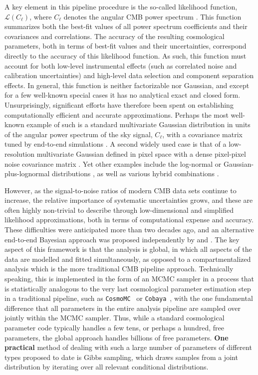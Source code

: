 \documentclass[twocolumn]{aa}
\def\cosmomc{\texttt{CosmoMC}}
\def\cobaya{\texttt{Cobaya}}
\begin{document}
A key element in this pipeline procedure is the so-called likelihood function, $\mathcal{L}(C_{\ell})$, where $C_{\ell}$ denotes the angular CMB power spectrum \citep[e.g.,][]{planck2016-l05}. This function summarizes both the best-fit values of all power spectrum coefficients and their covariances and correlations. The accuracy of the resulting cosmological parameters, both in terms of best-fit values and their uncertainties, correspond directly to the accuracy of this likelihood function. As such, this function must account for both low-level instrumental effects (such as correlated noise and calibration uncertainties) and high-level data selection and component separation effects. In general, this function is neither factorizable nor Gaussian, and except for a few well-known special cases it has no analytical exact and closed form. Unsurprisingly, significant efforts have therefore been spent on establishing computationally efficient and accurate approximations. Perhaps the most well-known example of such is a standard multivariate Gaussian distribution in units of the angular power spectrum of the sky signal, $C_{\ell}$, with a covariance matrix tuned by end-to-end simulations \citep[e.g.,][]{planck2016-l05}. A second widely used case is that of a low-resolution multivariate Gaussian defined in pixel space with a dense pixel-pixel noise covariance matrix \citep{hinshaw2012,planck2016-l05}. Yet other examples include the log-normal or Gaussian-plus-lognormal distributions \citep[e.g.,][]{verde2003}, as well as various hybrid combinations \citep[e.g.,][]{gjerlow2013}. 

However, as the signal-to-noise ratios of modern CMB data sets continue to increase, the relative importance of systematic uncertainties grows, and these are often highly non-trivial to describe through low-dimensional and simplified likelihood approximations, both in terms of computational expense and accuracy. These difficulties were anticipated more than two decades ago, and an alternative end-to-end Bayesian approach was proposed independently by \citet{jewell2004} and \citet{wandelt2004}. The key aspect of this framework is that the analysis is global, in which all aspects of the data are modelled and fitted simultaneously, as opposed to a compartmentalized analysis which is the more traditional CMB pipeline approach. Technically speaking, this is implemented in the form of an MCMC sampler in a process that is statistically analogous to the very last cosmological parameter estimation step in a traditional pipeline, such as \cosmomc\ \citep{cosmomc} or \cobaya\ \citep{Torrado:2020dgo}, with the one fundamental difference that all parameters in the entire analysis pipeline are sampled over jointly within the MCMC sampler. Thus, while a standard cosmological parameter code typically handles a few tens, or perhaps a hundred, free parameters, the global approach handles billions of free parameters. \textbf{One practical} method of dealing with such a large number of parameters of different types proposed to date is Gibbs sampling, which draws samples from a joint distribution by iterating over all relevant conditional distributions.
\end{document}
